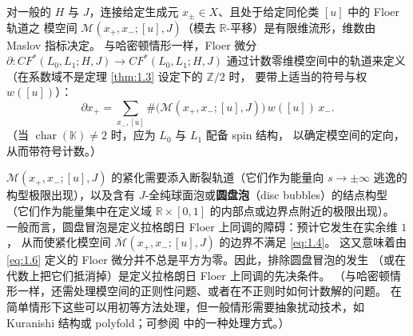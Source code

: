 \documentclass[UTF8,a4paper,11pt,fontset=windows]{ctexart}
\theoremstyle{cnthm}
\numberwithin{equation}{section}
\newcommand{\R}{\mathbb{R}}
\newcommand{\Z}{\mathbb{Z}}
\newcommand{\KK}{\mathbb{K}}          %
\newcommand{\CF}{CF}                  %
\begin{document}

对一般的 $H$ 与 $J$，连接给定生成元 $x_{\pm}\in X$、且处于给定同伦类 $[u]$ 中的 Floer 轨道之
模空间 $\mathcal{M}(x_+,x_-;[u],J)$（模去 $\R$-平移）是有限维流形，维数由 Maslov 指标决定。
与哈密顿情形一样，Floer 微分 $\partial:\CF^{*}(L_0,L_1;H,J)\to\CF^{*}(L_0,L_1;H,J)$
通过计数零维模空间中的轨道来定义（在系数域不是定理 \ref{thm:1.3} 设定下的 $\Z/2$ 时，
要带上适当的符号与权 $w([u])$）：
\begin{equation}\label{eq:1.6}
\partial x_+=\sum_{x_-,[u]}\#\bigl(\mathcal{M}(x_+,x_-;[u],J)\bigr)\,w([u])\,x_-.
\end{equation}
（当 $\operatorname{char}(\KK)\neq 2$ 时，应为 $L_0$ 与 $L_1$ 配备 spin 结构，
以确定模空间的定向，从而带符号计数。）

$\mathcal{M}(x_+,x_-;[u],J)$ 的紧化需要添入断裂轨道（它们作为能量向 $s\to\pm\infty$ 逃逸的
构型极限出现），以及含有 $J$-全纯球面泡或\textbf{圆盘泡}（disc bubbles）的结点构型
（它们作为能量集中在定义域 $\R\times[0,1]$ 的内部点或边界点附近的极限出现）。
一般而言，圆盘冒泡是定义拉格朗日 Floer 上同调的障碍：预计它发生在实余维 $1$，
从而使紧化模空间 $\overline{\mathcal{M}}(x_+,x_-;[u],J)$ 的边界不满足 \eqref{eq:1.4}。
这又意味着由 \eqref{eq:1.6} 定义的 Floer 微分并不总是平方为零。因此，排除圆盘冒泡的发生
（或在代数上把它们抵消掉）是定义拉格朗日 Floer 上同调的先决条件。
（与哈密顿情形一样，还需处理模空间的正则性问题、或者在不正则时如何计数解的问题。
在简单情形下这些可以用初等方法处理，但一般情形需要抽象扰动技术，如 Kuranishi 结构或
polyfold；可参阅 \cite{r45} 中的一种处理方式。）

\end{document}
